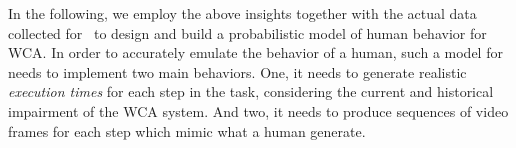 In the following, we employ the above insights together with the actual data collected for~\cite{olguinmunoz:impact2021} to design and build a probabilistic model of human behavior for \ac{WCA}.
In order to accurately emulate the behavior of a human, such a model for needs to implement two main behaviors.
One, it needs to generate realistic \emph{execution times} for each step in the task, considering the current and historical impairment of the \ac{WCA} system.
And two, it needs to produce sequences of video frames for each step which mimic what a human generate.



\newpage